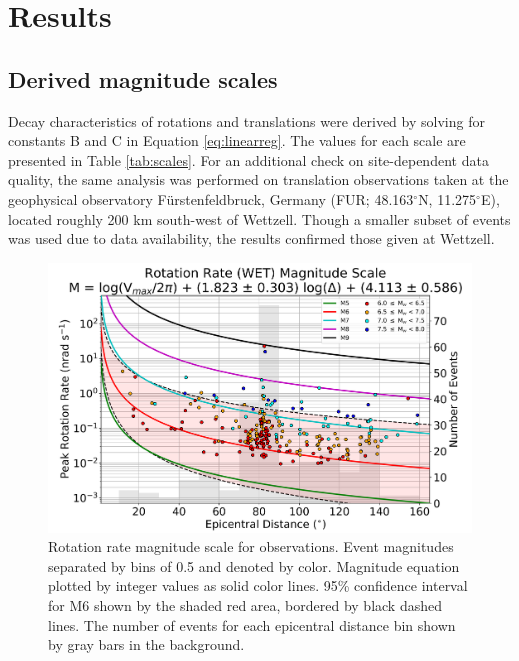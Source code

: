 \documentclass{gji}
\begin{document}
\section{Results}\label{sec:results}
\subsection{Derived magnitude scales}
Decay characteristics of rotations and translations were derived by solving for constants B and C in Equation \ref{eq:linearreg}. The values for each scale are presented in Table \ref{tab:scales}. For an additional check on site-dependent data quality, the same analysis was performed on translation observations taken at the geophysical observatory F\"urstenfeldbruck, Germany (FUR; 48.163$^\circ$N, 11.275$^\circ$E), located roughly 200 km south-west of Wettzell. Though a smaller subset of events was used due to data availability, the results confirmed those given at Wettzell. 


\begin{figure}
\centerline{\includegraphics[width=.8\textwidth]{RR_WET}}
\caption{Rotation rate magnitude scale for observations. Event magnitudes separated by bins of 0.5 and denoted by color. Magnitude equation plotted by integer values as solid color lines. 95\% confidence interval for M6 shown by the shaded red area, bordered by black dashed lines. The number of events for each epicentral distance bin shown by gray bars in the background.}
\label{fig:rr_obs}
\end{figure}
\end{document}
